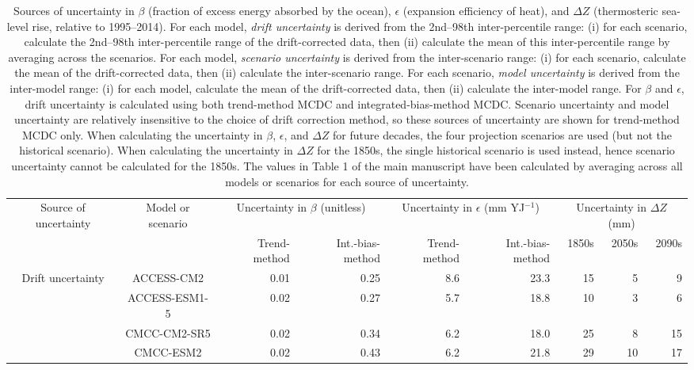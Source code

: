 \begin{table*}[t]
\centering
\caption{Sources of uncertainty in $\beta$ (fraction of excess energy absorbed by the ocean), $\epsilon$ (expansion efficiency of heat), and ${\Delta}Z$ (thermosteric sea-level rise, relative to 1995--2014). For each model, \emph{drift uncertainty} is derived from the 2nd--98th inter-percentile range: (i) for each scenario, calculate the 2nd--98th inter-percentile range of the drift-corrected data, then (ii) calculate the mean of this inter-percentile range by averaging across the scenarios. For each model, \emph{scenario uncertainty} is derived from the inter-scenario range: (i) for each scenario, calculate the mean of the drift-corrected data, then (ii) calculate the inter-scenario range. For each scenario, \emph{model uncertainty} is derived from the inter-model range: (i) for each model, calculate the mean of the drift-corrected data, then (ii) calculate the inter-model range. For $\beta$ and $\epsilon$, drift uncertainty is calculated using both trend-method MCDC and integrated-bias-method MCDC. Scenario uncertainty and model uncertainty are relatively insensitive to the choice of drift correction method, so these sources of uncertainty are shown for trend-method MCDC only. When calculating the uncertainty in $\beta$, $\epsilon$, and ${\Delta}Z$ for future decades, the four projection scenarios are used (but not the historical scenario). When calculating the uncertainty in ${\Delta}Z$ for the 1850s, the single historical scenario is used instead, hence scenario uncertainty cannot be calculated for the 1850s. The values in Table 1 of the main manuscript have been calculated by averaging across all models or scenarios for each source of uncertainty.}
\begin{tabular}{c|c|rr|rr|rrr}
\toprule
Source of uncertainty & Model or scenario & \multicolumn{2}{c|}{Uncertainty in $\beta$ (unitless)} & \multicolumn{2}{c|}{Uncertainty in $\epsilon$ (mm YJ$^{-1}$)} & \multicolumn{3}{c}{Uncertainty in ${\Delta}Z$ (mm)} \\
 &  & Trend-method & Int.-bias-method & Trend-method & Int.-bias-method & 1850s & 2050s & 2090s \\
\midrule
\multirow[c]{16}{*}{Drift uncertainty} & ACCESS-CM2 & 0.01 & 0.25 & 8.6 & 23.3 & 15 & 5 & 9 \\
 & ACCESS-ESM1-5 & 0.02 & 0.27 & 5.7 & 18.8 & 10 & 3 & 6 \\
 & CMCC-CM2-SR5 & 0.02 & 0.34 & 6.2 & 18.0 & 25 & 8 & 15 \\
 & CMCC-ESM2 & 0.02 & 0.43 & 6.2 & 21.8 & 29 & 10 & 17 \\

\end{tabular}
\end{table*}
